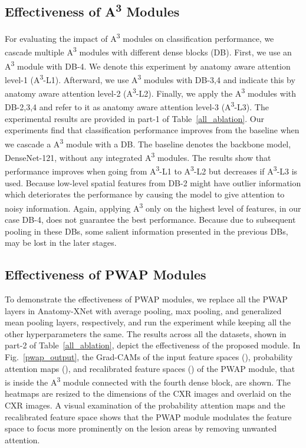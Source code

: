 \documentclass[journal]{IEEEtran}
\begin{document}
\subsection{Effectiveness of \texorpdfstring{A\textsuperscript{3}}{A3} Modules}
For evaluating the impact of A\textsuperscript{3} modules on classification performance, we cascade multiple A\textsuperscript{3} modules with different dense blocks (DB). First, we use an A\textsuperscript{3} module with DB-4. We denote this experiment by anatomy aware attention level-1 (A\textsuperscript{3}-L1). Afterward, we use A\textsuperscript{3} modules with DB-3,4 and indicate this by anatomy aware attention level-2 (A\textsuperscript{3}-L2). Finally, we apply the A\textsuperscript{3} modules with DB-2,3,4 and refer to it as anatomy aware attention level-3 (A\textsuperscript{3}-L3). The experimental results are provided in part-1 of Table~\ref{all_ablation}. Our experiments find that classification performance improves from the baseline when we cascade a A\textsuperscript{3} module with a DB. The baseline denotes the backbone model, DenseNet-121, without any integrated A\textsuperscript{3} modules. The results show that performance improves when going from A\textsuperscript{3}-L1 to A\textsuperscript{3}-L2 but decreases if A\textsuperscript{3}-L3 is used. Because low-level spatial features from DB-2 might have outlier information which deteriorates the performance by causing the model to give attention to noisy information. Again, applying A\textsuperscript{3} only on the highest level of features, in our case DB-4, does not guarantee the best performance. Because due to subsequent pooling in these DBs, some salient information presented in the previous DBs, may be lost in the later stages. 

\subsection{Effectiveness of PWAP Modules}
To demonstrate the effectiveness of PWAP modules, we replace all the PWAP layers in Anatomy-XNet with average pooling, max pooling, and generalized mean pooling \cite{Berman2019MultiGrainAU} layers, respectively, and run the experiment while keeping all the other hyperparameters the same. The results across all the datasets, shown in part-2 of Table~\ref{all_ablation}, depict the effectiveness of the proposed module. In Fig.~\ref{pwap_output}, the Grad-CAMs of the input feature spaces (), probability attention maps (), and recalibrated feature spaces () of the PWAP module, that is inside the A\textsuperscript{3} module connected with the fourth dense block, are shown. The heatmaps are resized to the dimensions of the CXR images and overlaid on the CXR images. A visual examination of the probability attention maps and the recalibrated feature space shows that the PWAP module modulates the feature space to focus more prominently on the lesion areas by removing unwanted attention.
\end{document}
